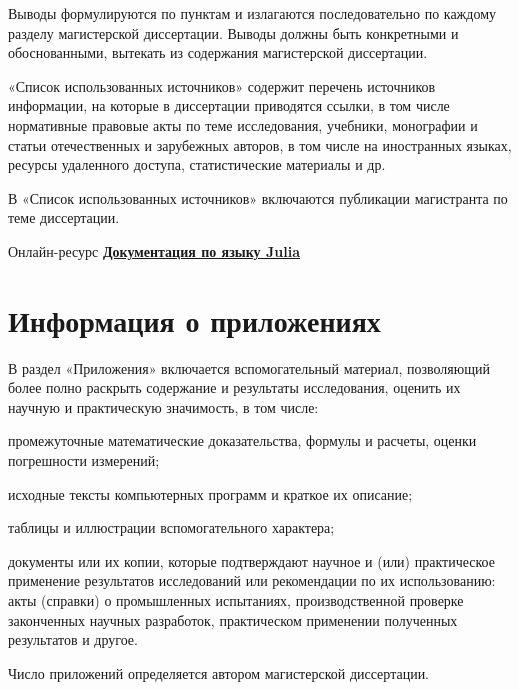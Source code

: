 \documentclass{mpaper}
\begin{document}
    Выводы формулируются по пунктам и излагаются последовательно по каждому разделу магистерской диссертации. Выводы должны быть конкретными и обоснованными, вытекать из содержания магистерской диссертации.

    «Список использованных источников» содержит перечень источников информации, на которые в диссертации приводятся ссылки, в том числе нормативные правовые акты по теме исследования, учебники, монографии и статьи отечественных и зарубежных авторов, в том числе на иностранных языках, ресурсы удаленного доступа, статистические материалы и др.

    В «Список использованных источников» включаются публикации магистранта по теме диссертации.
    \begin{thebibliography}{9}
        Онлайн-ресурс \href{https://docs.julialang.org}{\bfseries Документация по языку Julia}
    \end{thebibliography}
    \appendix
    \chapter{Информация о приложениях}
    В раздел «Приложения» включается вспомогательный материал, позволяющий более полно раскрыть содержание и результаты исследования, оценить их научную и практическую значимость, в том числе:

    промежуточные математические доказательства, формулы и расчеты, оценки погрешности измерений;

    исходные тексты компьютерных программ и краткое их описание;

    таблицы и иллюстрации вспомогательного характера;

    документы или их копии, которые подтверждают научное и (или) практическое применение результатов исследований или рекомендации по их использованию: акты (справки) о промышленных испытаниях, производственной проверке законченных научных разработок, практическом применении полученных результатов и другое.

    Число приложений определяется автором магистерской диссертации.
\end{document}
